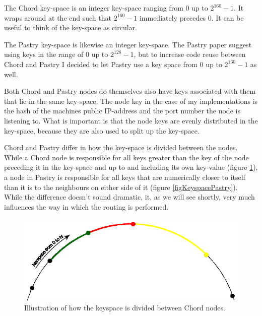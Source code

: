 The Chord key-space is an integer key-space ranging from 0 up to $2^{160} - 1$. It wraps around at the end such that $2^{160} - 1$ immediately precedes 0. It can be useful to think of the key-space as circular.

The Pastry key-space is likewise an integer key-space. The Pastry paper suggest using keys in the range of 0 up to $2^{128} - 1$, but to increase code reuse between Chord and Pastry I decided to let Pastry use a key space from 0 up to $2^{160} - 1$ as well.

Both Chord and Pastry nodes do themselves also have keys associated with them that lie in the same key-space. The node key in the case of my implementations is the hash of the machines public IP-address and the port number the node is listening to. What is important is that the node keys are evenly distributed in the key-space, because they are also used to split up the key-space.

Chord and Pastry differ in how the key-space is divided between the nodes. While a Chord node is responsible for all keys greater than the key of the node preceding it in the key-space and up to and including its own key-value (figure \ref{figKeyspaceChord}), a node in Pastry is responsible for all keys that are numerically closer to itself than it is to the neighbours on either side of it (figure \ref{figKeyspacePastry}). While the difference doesn't sound dramatic, it, as we will see shortly, very much influences the way in which the routing is performed.

\begin{figure}[!htb]
\begin{center}
	\includegraphics[width=0.9\linewidth]{illustrations/ChordKeySpace.eps}
  \caption{Illustration of how the keyspace is divided between Chord nodes.}
  \label{figKeyspaceChord}
\end{center}
\end{figure}

